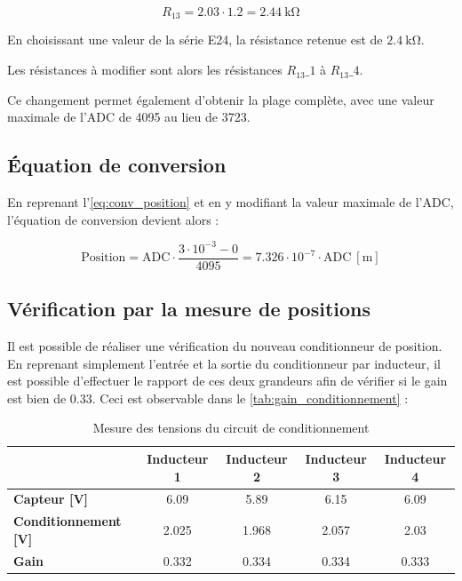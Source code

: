 \begin{equation}
    R_{13} = 2.03 \cdot 1.2 = \SI{2.44}{\kilo\ohm}
\end{equation}

En choisissant une valeur de la série E24, la résistance retenue est de $\SI{2.4}{\kilo\ohm}$.

Les résistances à modifier sont alors les résistances $R_{13}\_1$ à $R_{13}\_4$.

Ce changement permet également d'obtenir la plage complète, avec une valeur maximale de l'ADC de 4095 au lieu de 3723.

\subsection{Équation de conversion}
En reprenant l'\autoref{eq:conv_position} et en y modifiant la valeur maximale de l'ADC, l'équation de conversion devient alors :

\begin{equation}
    \text{Position} = \text{ADC} \cdot \frac{3 \cdot 10^{-3} - 0}{4095} = 7.326 \cdot 10^{-7} \cdot \text{ADC}~[\text{m}]
\end{equation}

\subsection{Vérification par la mesure de positions}
Il est possible de réaliser une vérification du nouveau conditionneur de position. En reprenant simplement l'entrée et la sortie du conditionneur par inducteur, il est possible d'effectuer le rapport de ces deux grandeurs afin de vérifier si le gain est bien de 0.33. Ceci est observable dans le \autoref{tab:gain_conditionnement} :

\begin{table}[htbp]
    \centering
    \begin{tabular}{l cccc}
        \toprule
                                     & \textbf{Inducteur 1} & \textbf{Inducteur 2} & \textbf{Inducteur 3} & \textbf{Inducteur 4} \\
        \midrule
        \textbf{Capteur [V]}         & 6.09                 & 5.89                 & 6.15                 & 6.09                 \\
        \textbf{Conditionnement [V]} & 2.025                & 1.968                & 2.057                & 2.03                 \\
        \textbf{Gain}                & 0.332                & 0.334                & 0.334                & 0.333                \\
        \bottomrule
    \end{tabular}
    \caption{Mesure des tensions du circuit de conditionnement}
    \label{tab:gain_conditionnement}
\end{table}

